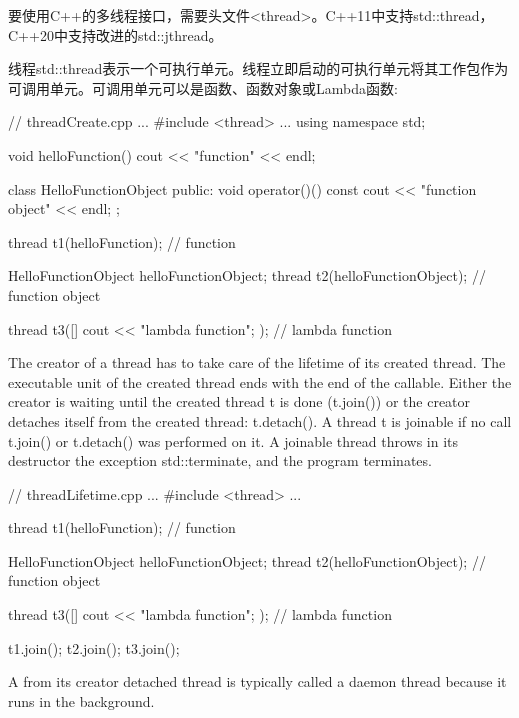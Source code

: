 
要使用C++的多线程接口，需要头文件<thread>。C++11中支持std::thread，C++20中支持改进的std::jthread。



线程std::thread表示一个可执行单元。线程立即启动的可执行单元将其工作包作为可调用单元。可调用单元可以是函数、函数对象或Lambda函数:


\begin{cpp}
// threadCreate.cpp
...
#include <thread>
...
using namespace std;

void helloFunction(){
	cout << "function" << endl;
}

class HelloFunctionObject {
public:
	void operator()() const {
		cout << "function object" << endl;
	}
};

thread t1(helloFunction); // function

HelloFunctionObject helloFunctionObject;
thread t2(helloFunctionObject); // function object

thread t3([]{ cout << "lambda function"; }); // lambda function
\end{cpp}


The creator of a thread has to take care of the lifetime of its created thread. The executable unit of the created thread ends with the end of the callable. Either the creator is waiting until the created thread t is done (t.join()) or the creator detaches itself from the created thread: t.detach(). A thread t is joinable if no call t.join() or t.detach() was performed on it. A joinable thread throws in its destructor the exception std::terminate, and the program terminates.


\begin{cpp}
// threadLifetime.cpp
...
#include <thread>
...

thread t1(helloFunction); // function

HelloFunctionObject helloFunctionObject;
thread t2(helloFunctionObject); // function object

thread t3([]{ cout << "lambda function"; }); // lambda function

t1.join();
t2.join();
t3.join();
\end{cpp}

A from its creator detached thread is typically called a daemon thread because it runs in the background.

